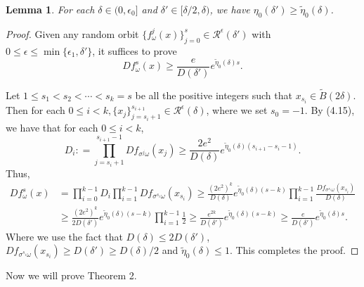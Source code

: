 \documentclass[11pt,oneside]{article}
\theoremstyle{plain}
\newtheorem{lem}{Lemma}[section]
\numberwithin{equation}{section}
\numberwithin{figure}{section}
\numberwithin{table}{section}
\begin{document}
\begin{lem}
For each $\delta \in (0, \epsilon_0]$ and $\delta' \in [\delta/2, \delta)$, we have $\eta_0(\delta') \geq \tilde \eta_0(\delta)$.
\end{lem}


\begin{proof}

Given any random orbit $\{ f_{\omega}^j(x) \}_{j=0}^s \in \mathcal R^{\epsilon}(\delta')$ with $0 \leq \epsilon \leq \min\{ \epsilon_1, \delta' \}$, it suffices to prove
\begin{equation}
Df_{\omega}^s(x) \geq \frac{e}{D(\delta')}e^{\tilde \eta_0(\delta) s}.
\end{equation}


Let $1 \leq s_1 < s_2 < \cdots < s_k = s$ be all the positive integers such that $x_{s_i} \in \tilde B(2 \delta)$. Then for each $0 \leq i < k, \{ x_j\}_{j = s_i +1}^{s_{i+1}} \in \mathcal R^{\epsilon}(\delta)$, where we set $s_0 = -1$. By (4.15), we have that for each $0 \leq i < k$,
\[
D_i : = \prod_{j =s_i+1}^{s_{i+1} -1} Df_{\sigma^j \omega}(x_j) \geq \frac{2e^2}{D(\delta)} e^{\tilde \eta_0(\delta) (s_{i+1} -s_i -1)}.
\]
Thus,
\begin{align*}
Df_{\omega}^s(x) &= \prod_{i=0}^{k-1} D_i \prod_{i=1}^{k-1} Df_{\sigma^{s_i} \omega}(x_{s_i}) \geq \frac{(2e^2)^k}{D(\delta)} e^{\tilde \eta_0(\delta) (s-k)} \prod_{i=1}^{k-1} \frac{D f_{\sigma^{s_i} \omega}(x_{s_i})}{D(\delta)}\\
& \geq \frac{(2e^2)^k}{2D(\delta') } e^{\tilde \eta_0(\delta) (s-k)} \prod_{i=1}^{k-1} \frac{1}{2} \geq \frac{e^{2k}}{D(\delta') } e^{\tilde \eta_0(\delta) (s-k)} \geq \frac{e}{D(\delta')}e^{\tilde \eta_0(\delta) s}.
\end{align*}
Where we use the fact that $D(\delta) \leq 2 D(\delta')$, $Df_{\sigma^{s_i} \omega}(x_{s_i}) \geq D(\delta') \geq D(\delta)/2$ and $\tilde \eta_0(\delta) \leq 1$. This completes the proof.


\end{proof}


Now we will prove Theorem 2.
\end{document}
